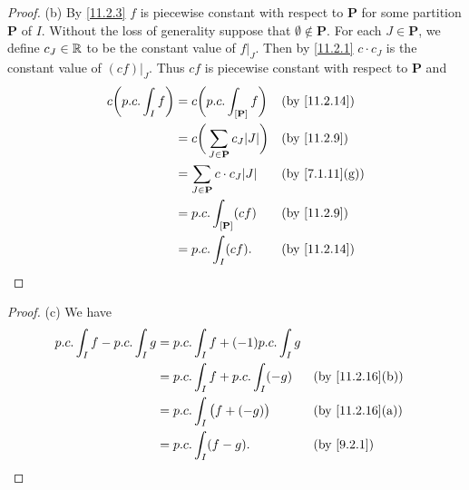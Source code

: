 \begin{proof}{(b)}
  By \cref{11.2.3} \(f\) is piecewise constant with respect to \(\mathbf{P}\) for some partition \(\mathbf{P}\) of \(I\).
  Without the loss of generality suppose that \(\emptyset \notin \mathbf{P}\).
  For each \(J \in \mathbf{P}\), we define \(c_J \in \mathbb{R}\) to be the constant value of \(f|_J\).
  Then by \cref{11.2.1} \(c \cdot c_J\) is the constant value of \((cf)|_J\).
  Thus \(cf\) is piecewise constant with respect to \(\mathbf{P}\) and
  \begin{align*}
    c \bigg(p.c. \int_I f\bigg) & = c \bigg(p.c. \int_{[\mathbf{P}]} f\bigg)          &  & \text{(by \cref{11.2.14})}   \\
                                & = c \bigg(\sum_{J \in \mathbf{P}} c_J \abs{J}\bigg) &  & \text{(by \cref{11.2.9})}    \\
                                & = \sum_{J \in \mathbf{P}} c \cdot c_J \abs{J}       &  & \text{(by \cref{7.1.11}(g))} \\
                                & = p.c. \int_{[\mathbf{P}]} (c f)                    &  & \text{(by \cref{11.2.9})}    \\
                                & = p.c. \int_I (c f).                                &  & \text{(by \cref{11.2.14})}
  \end{align*}
\end{proof}

\begin{proof}{(c)}
  We have
  \begin{align*}
    p.c. \int_I f - p.c. \int_I g & = p.c. \int_I f + (-1) p.c. \int_I g                                    \\
                                  & = p.c. \int_I f + p.c. \int_I (-g)   &  & \text{(by \cref{11.2.16}(b))} \\
                                  & = p.c. \int_I \big(f + (-g)\big)     &  & \text{(by \cref{11.2.16}(a))} \\
                                  & = p.c. \int_I (f - g).               &  & \text{(by \cref{9.2.1})}
  \end{align*}
\end{proof}

